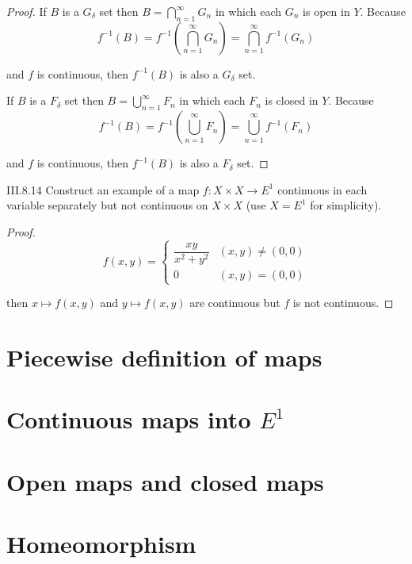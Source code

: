 \begin{proof}
	If \( B \) is a \( G_{\delta} \) set then \( B = \bigcap^{\infty}_{n=1} G_{n} \) in which each \( G_{n} \) is open in \( Y \). Because
	\[
		f^{-1}(B) = f^{-1}\left( \bigcap^{\infty}_{n=1} G_{n} \right) = \bigcap^{\infty}_{n=1} f^{-1}(G_{n})
	\]

	and \( f \) is continuous, then \( f^{-1}(B) \) is also a \( G_{\delta} \) set.

	If \( B \) is a \( F_{\delta} \) set then \( B = \bigcup^{\infty}_{n=1} F_{n} \) in which each \( F_{n} \) is closed in \( Y \). Because
	\[
		f^{-1}(B) = f^{-1}\left( \bigcup^{\infty}_{n=1} F_{n} \right) = \bigcup^{\infty}_{n=1} f^{-1}(F_{n})
	\]

	and \( f \) is continuous, then \( f^{-1}(B) \) is also a \( F_{\delta} \) set.
\end{proof}

\begin{problem}{III.8.14}
Construct an example of a map \( f: X \times X \to E^{1} \) continuous in each variable separately but not continuous on \( X \times X \) (use \( X = E^{1} \) for simplicity).
\end{problem}

\begin{proof}
	\[
		f(x, y) = \begin{cases}
			\dfrac{xy}{x^{2} + y^{2}} & (x, y) \ne (0, 0) \\
			0                         & (x, y) = (0, 0)
		\end{cases}
	\]

	then \( x \mapsto f(x, y) \) and \( y \mapsto f(x, y) \) are continuous but \( f \) is not continuous.
\end{proof}

\section{Piecewise definition of maps}

\section{Continuous maps into \( E^{1} \)}

\section{Open maps and closed maps}

\section{Homeomorphism}
